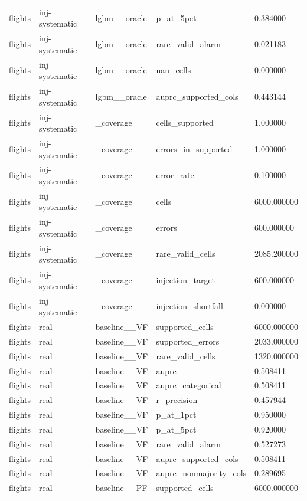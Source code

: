 \begin{tabular}{lllll}
flights & inj-systematic & lgbm\_\_oracle & p\_at\_5pct & 0.384000 \\
flights & inj-systematic & lgbm\_\_oracle & rare\_valid\_alarm & 0.021183 \\
flights & inj-systematic & lgbm\_\_oracle & nan\_cells & 0.000000 \\
flights & inj-systematic & lgbm\_\_oracle & auprc\_supported\_cols & 0.443144 \\
flights & inj-systematic & \_coverage & cells\_supported & 1.000000 \\
flights & inj-systematic & \_coverage & errors\_in\_supported & 1.000000 \\
flights & inj-systematic & \_coverage & error\_rate & 0.100000 \\
flights & inj-systematic & \_coverage & cells & 6000.000000 \\
flights & inj-systematic & \_coverage & errors & 600.000000 \\
flights & inj-systematic & \_coverage & rare\_valid\_cells & 2085.200000 \\
flights & inj-systematic & \_coverage & injection\_target & 600.000000 \\
flights & inj-systematic & \_coverage & injection\_shortfall & 0.000000 \\
flights & real & baseline\_\_VF & supported\_cells & 6000.000000 \\
flights & real & baseline\_\_VF & supported\_errors & 2033.000000 \\
flights & real & baseline\_\_VF & rare\_valid\_cells & 1320.000000 \\
flights & real & baseline\_\_VF & auprc & 0.508411 \\
flights & real & baseline\_\_VF & auprc\_categorical & 0.508411 \\
flights & real & baseline\_\_VF & r\_precision & 0.457944 \\
flights & real & baseline\_\_VF & p\_at\_1pct & 0.950000 \\
flights & real & baseline\_\_VF & p\_at\_5pct & 0.920000 \\
flights & real & baseline\_\_VF & rare\_valid\_alarm & 0.527273 \\
flights & real & baseline\_\_VF & auprc\_supported\_cols & 0.508411 \\
flights & real & baseline\_\_VF & auprc\_nonmajority\_cols & 0.289695 \\
flights & real & baseline\_\_PF & supported\_cells & 6000.000000 \\

\end{tabular}
